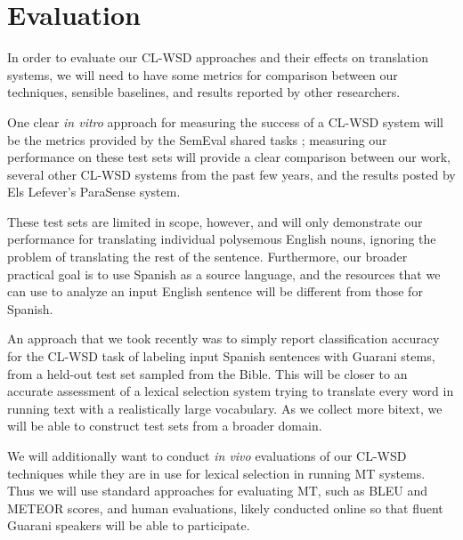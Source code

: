 \section{Evaluation}

In order to evaluate our CL-WSD approaches and their effects on translation
systems, we will need to have some metrics for comparison between our
techniques, sensible baselines, and results reported by other researchers.

One clear \emph{in vitro} approach for measuring the success of a CL-WSD system
will be the metrics provided by the SemEval shared tasks
\cite{lefever-hoste:2009:SEW,task10}; measuring our performance on these test
sets will provide a clear comparison between our work, several other CL-WSD
systems from the past few years, and the results posted by Els Lefever's
ParaSense system.

These test sets are limited in scope, however, and will only demonstrate our
performance for translating individual polysemous English nouns, ignoring the
problem of translating the rest of the sentence.
Furthermore, our broader practical goal is to use Spanish as a source language,
and the resources that we can use to analyze an input English sentence will be
different from those for Spanish.

An approach that we took recently \cite{rudnick-gasser:2013:HyTra-2013} was to
simply report classification accuracy for the CL-WSD task of labeling input
Spanish sentences with Guarani stems, from a held-out test set sampled from the
Bible.
This will be closer to an accurate assessment of a lexical selection system
trying to translate every word in running text with a realistically large
vocabulary. As we collect more bitext, we will be able to construct test sets
from a broader domain.

We will additionally want to conduct \emph{in vivo} evaluations of our CL-WSD
techniques while they are in use for lexical selection in running MT systems.
Thus we will use standard approaches for evaluating MT, such as BLEU and METEOR
scores, and human evaluations, likely conducted online so that fluent Guarani
speakers will be able to participate.
